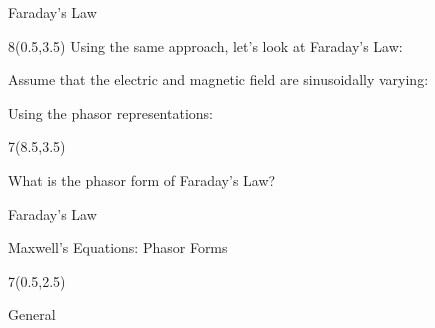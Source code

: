 \begin{lesson33}
\begin{frame}{Faraday's Law}
\begin{textblock}{8}(0.5,3.5)
\; Using the same approach, let's look at Faraday's Law:
\begin{small}
\end{small}
\; Assume that the electric and magnetic field are sinusoidally varying:
\vspace{-8pt}

\vspace{-8pt}

\; Using the phasor representations: 

\vspace{-18pt}

\begin{small}
\end{small}
\end{textblock}
\begin{textblock}{7}(8.5,3.5)
\begin{small}
\; What is the phasor form of Faraday's Law?
\end{small}
\begin{myblock}[0.9]{Faraday's Law}
\end{myblock}
\end{textblock}
\end{frame}

\begin{frame}{Maxwell's Equations: Phasor Forms}
\begin{textblock}{7}(0.5,2.5)
\begin{myblock}[0.95]{General}
\begin{small}
\end{small}
\end{myblock}
\end{textblock}


\end{frame}
\end{lesson33}
